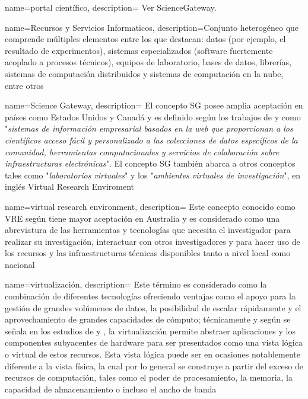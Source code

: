 {
	name={portal científico},
	description={
		Ver \gls{ScienceGateway}.
	}
}

{
	name={Recursos y Servicios Informaticos},
	description={Conjunto heterogéneo que comprende múltiples elementos entre los que destacan: datos (por ejemplo, el resultado de experimentos), sistemas especializados (software fuertemente acoplado a procesos técnicos), equipos de laboratorio, bases de datos, librerías, sistemas de computación distribuidos y sistemas de computación en la nube, entre otros
	}	
}


{
	name={Science Gateway},
	description={
		El concepto \acrfull{SG} posee amplia aceptación en países como Estados Unidos y Canadá y es definido según los trabajos de \textcite{Barker2019} y \textcite{Wilkins-Diehr2013} como "\textit{sistemas de información empresarial basados en la web que proporcionan a los científicos acceso fácil y personalizado a las colecciones de datos específicos de la comunidad, herramientas computacionales y servicios de colaboración sobre infraestructuras electrónicas}". El concepto \acrshort{SG} también abarca a otros conceptos tales como "\textit{laboratorios virtuales}" y los "\textit{ambientes virtuales de investigación}", en inglés Virtual Research Enviroment
	}
}


{
	name={virtual research environment},
	description={
		Este concepto conocido como \acrfull{VRE} según \textcite{Barker2019} tiene mayor aceptación en Australia y es considerado como una abreviatura de las herramientas y tecnologías que necesita el investigador para realizar su investigación, interactuar con otros investigadores y para hacer uso de los recursos y las infraestructuras técnicas disponibles tanto a nivel local como nacional
	}
}

{
	name={virtualización},
	description={
		Este término es considerado como la combinación de diferentes tecnologías ofreciendo ventajas como el apoyo para la gestión de grandes volúmenes de datos, la posibilidad de escalar rápidamente y el aprovechamiento de grandes capacidades de cómputo; técnicamente y según se señala en los estudios de \textcite{Kusnetzky2011}  y \textcite{AbdElRahem2016}, la virtualización permite abstraer aplicaciones y los componentes subyacentes de hardware para ser presentados como una vista lógica o virtual de estos recursos. Esta vista lógica puede ser en ocasiones notablemente diferente a la vista física, la cual por lo general se construye a partir del exceso de recursos de computación, tales como el poder de procesamiento, la memoria, la capacidad de almacenamiento o incluso el ancho de banda \parencite{Stallings2015}
	}
}

